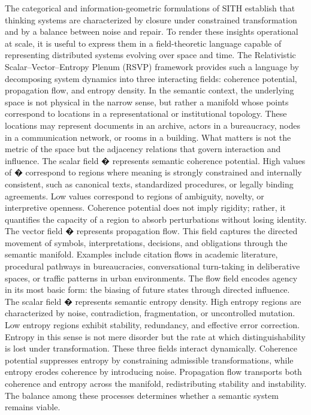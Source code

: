 \documentclass[11pt,oneside]{article}
\begin{document}
The categorical and information-geometric formulations of SITH establish that thinking systems are characterized by closure under constrained transformation and by a balance between noise and repair. To render these insights operational at scale, it is useful to express them in a field-theoretic language capable of representing distributed systems evolving over space and time. The Relativistic Scalar–Vector–Entropy Plenum (RSVP) framework provides such a language by decomposing system dynamics into three interacting fields: coherence potential, propagation flow, and entropy density.
In the semantic context, the underlying space is not physical in the narrow sense, but rather a manifold whose points correspond to locations in a representational or institutional topology. These locations may represent documents in an archive, actors in a bureaucracy, nodes in a communication network, or rooms in a building. What matters is not the metric of the space but the adjacency relations that govern interaction and influence.
The scalar field � represents semantic coherence potential. High values of � correspond to regions where meaning is strongly constrained and internally consistent, such as canonical texts, standardized procedures, or legally binding agreements. Low values correspond to regions of ambiguity, novelty, or interpretive openness. Coherence potential does not imply rigidity; rather, it quantifies the capacity of a region to absorb perturbations without losing identity.
The vector field � represents propagation flow. This field captures the directed movement of symbols, interpretations, decisions, and obligations through the semantic manifold. Examples include citation flows in academic literature, procedural pathways in bureaucracies, conversational turn-taking in deliberative spaces, or traffic patterns in urban environments. The flow field encodes agency in its most basic form: the biasing of future states through directed influence.
The scalar field � represents semantic entropy density. High entropy regions are characterized by noise, contradiction, fragmentation, or uncontrolled mutation. Low entropy regions exhibit stability, redundancy, and effective error correction. Entropy in this sense is not mere disorder but the rate at which distinguishability is lost under transformation.
These three fields interact dynamically. Coherence potential suppresses entropy by constraining admissible transformations, while entropy erodes coherence by introducing noise. Propagation flow transports both coherence and entropy across the manifold, redistributing stability and instability. The balance among these processes determines whether a semantic system remains viable.
\end{document}
